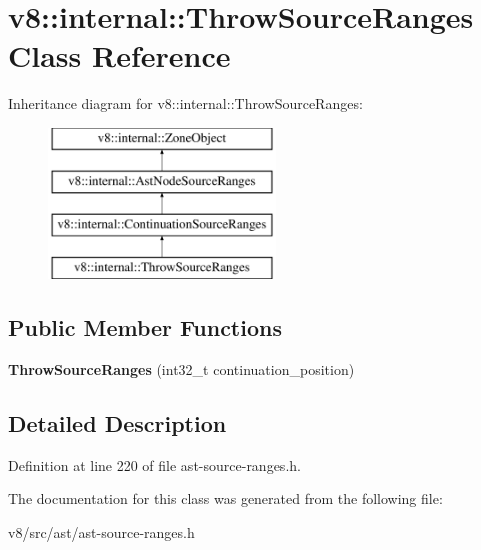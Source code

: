 \hypertarget{classv8_1_1internal_1_1ThrowSourceRanges}{}\section{v8\+:\+:internal\+:\+:Throw\+Source\+Ranges Class Reference}
\label{classv8_1_1internal_1_1ThrowSourceRanges}
Inheritance diagram for v8\+:\+:internal\+:\+:Throw\+Source\+Ranges\+:\begin{figure}[H]
\begin{center}
\leavevmode
\includegraphics[height=4.000000cm]{classv8_1_1internal_1_1ThrowSourceRanges}
\end{center}
\end{figure}
\subsection*{Public Member Functions}
\begin{DoxyCompactItemize}
\item 
\mbox{\label{classv8_1_1internal_1_1ThrowSourceRanges_a7790b514646b51d1bfd56169dbc6b5ee}} 
{\bfseries Throw\+Source\+Ranges} (int32\+\_\+t continuation\+\_\+position)
\end{DoxyCompactItemize}


\subsection{Detailed Description}


Definition at line 220 of file ast-\/source-\/ranges.\+h.



The documentation for this class was generated from the following file\+:\begin{DoxyCompactItemize}
\item 
v8/src/ast/ast-\/source-\/ranges.\+h\end{DoxyCompactItemize}
